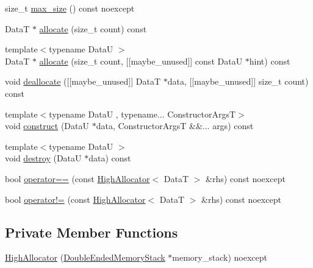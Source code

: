 \begin{DoxyCompactItemize}
\item 
size\+\_\+t \hyperlink{structmage_1_1_double_ended_memory_stack_1_1_high_allocator_a6adfd0ed341c637ce0d0edc9d3d02c27}{max\+\_\+size} () const noexcept
\item 
DataT $\ast$ \hyperlink{structmage_1_1_double_ended_memory_stack_1_1_high_allocator_ab6585eebb7bb11dcee1945b11b50ea98}{allocate} (size\+\_\+t count) const
\item 
{\footnotesize template$<$typename DataU $>$ }\\DataT $\ast$ \hyperlink{structmage_1_1_double_ended_memory_stack_1_1_high_allocator_aa7dd068405263cadbe9ecaeffa5a6500}{allocate} (size\+\_\+t count, \mbox{[}\mbox{[}maybe\+\_\+unused\mbox{]}\mbox{]} const DataU $\ast$hint) const
\item 
void \hyperlink{structmage_1_1_double_ended_memory_stack_1_1_high_allocator_ac03c8e0dff549f8765b3591c9c671d58}{deallocate} (\mbox{[}\mbox{[}maybe\+\_\+unused\mbox{]}\mbox{]} DataT $\ast$data, \mbox{[}\mbox{[}maybe\+\_\+unused\mbox{]}\mbox{]} size\+\_\+t count) const
\item 
{\footnotesize template$<$typename DataU , typename... Constructor\+ArgsT$>$ }\\void \hyperlink{structmage_1_1_double_ended_memory_stack_1_1_high_allocator_ae52a710da5593ac53d57c249f451bec6}{construct} (DataU $\ast$data, Constructor\+ArgsT \&\&... args) const
\item 
{\footnotesize template$<$typename DataU $>$ }\\void \hyperlink{structmage_1_1_double_ended_memory_stack_1_1_high_allocator_a59a29334c0812bf6037ebb74361e0598}{destroy} (DataU $\ast$data) const
\item 
bool \hyperlink{structmage_1_1_double_ended_memory_stack_1_1_high_allocator_a1cc9124a1c31f2162a67662ee996dff4}{operator==} (const \hyperlink{structmage_1_1_double_ended_memory_stack_1_1_high_allocator}{High\+Allocator}$<$ DataT $>$ \&rhs) const noexcept
\item 
bool \hyperlink{structmage_1_1_double_ended_memory_stack_1_1_high_allocator_a54019d2f65bcde7caf42dc507745e776}{operator!=} (const \hyperlink{structmage_1_1_double_ended_memory_stack_1_1_high_allocator}{High\+Allocator}$<$ DataT $>$ \&rhs) const noexcept
\end{DoxyCompactItemize}
\subsection*{Private Member Functions}
\begin{DoxyCompactItemize}
\item 
\hyperlink{structmage_1_1_double_ended_memory_stack_1_1_high_allocator_a6d51325f813c70290379dcb472d093c3}{High\+Allocator} (\hyperlink{classmage_1_1_double_ended_memory_stack}{Double\+Ended\+Memory\+Stack} $\ast$memory\+\_\+stack) noexcept
\end{DoxyCompactItemize}
